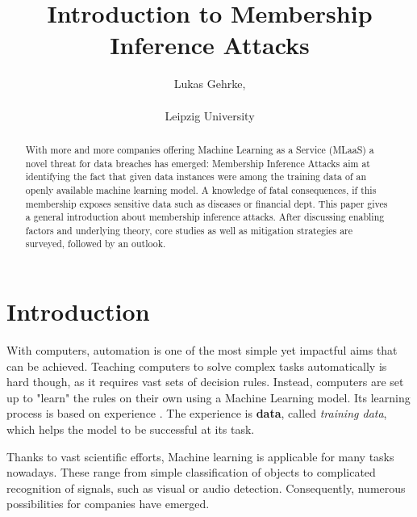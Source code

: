\documentclass[runningheads]{llncs}
\begin{document}
%
\title{Introduction to Membership Inference Attacks}
%
%
\author{Lukas Gehrke, \\
 \\
Leipzig University \\
}
%
%
%

\maketitle
%

\tableofcontents
\newpage

\begin{abstract} 
    With more and more companies offering Machine Learning as a Service (MLaaS) a novel threat for data breaches has emerged: Membership Inference Attacks aim at identifying the fact that given data instances were among the training data of an openly available machine learning model. A knowledge of fatal consequences, if this membership exposes sensitive data such as diseases or financial dept. This paper gives a general introduction about membership inference attacks. After discussing enabling factors and underlying theory, core studies as well as mitigation strategies are surveyed, followed by an outlook.
    
\end{abstract}
%
%
%
\section{Introduction}

With computers, automation is one of the most simple yet impactful aims that can be achieved.
Teaching computers to solve complex tasks automatically is hard though, as it requires vast sets of decision rules. Instead, computers are set up to "learn" the rules on their own using a Machine Learning model. Its learning process is based on experience \cite{mitchell1997machine}. The experience is \textbf{data}, called \textit{training data}, which helps the model to be successful at its task.

Thanks to vast scientific efforts, Machine learning is applicable for many tasks nowadays. These range from simple classification of objects to complicated recognition of signals, such as visual or audio detection. Consequently, numerous possibilities for companies have emerged. 
\end{document}
